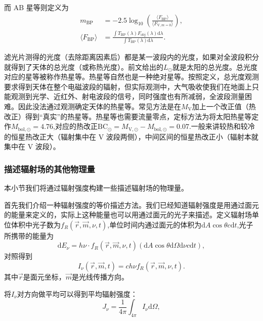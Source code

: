 \documentclass[../天体物理基础.tex]{subfiles}
\begin{document}
而 AB 星等则定义为
\begin{align}
m_{\mathrm{BP}}&=-2.5\log_{10}(\frac{\langle F_{\mathrm{BP}}\rangle}{\langle F_{\text{V},m=0}\rangle}),\\
\langle F_{\mathrm{BP}}\rangle&=\frac{\int T_{\mathrm{BP}}(\lambda)F_{\text{obj}}(\lambda)\mathrm{d}\lambda}{\int T_{\mathrm{BP}}(\lambda)\mathrm{d}\lambda}.
\end{align}

滤光片测得的光度（去除距离因素后）都是某一波段内的光度，如果对全波段积分就得到了天体的总光度（或称热光度）。前文给出的$L_{\odot}$就是太阳的总光度。总光度对应的星等被称作热星等。热星等自然也是一种绝对星等。按照定义，总光度观测要求得到天体在整个电磁波段的辐射，但实际观测中，大气吸收使我们在地面上只能观测到光学、近红外、射电波段的信号，同时强度也有所减弱，全波段测量困难。因此没法通过观测确定天体的热星等。常见方法是在$M_{\text{V}}$加上一个改正值（热改正）得到“真实”的热星等。热星等也需要流量零点，定标方法为将太阳热星等定作$M_{\mathrm{bol},\odot}=4.76$,对应的热改正$\mathrm{BC}_{\odot}=M_{\mathrm{V},\odot}-M_{\mathrm{bol},\odot}=0.07$.一般来讲较热和较冷的恒星热改正大（辐射集中在 V 波段两侧），中间区间的恒星热改正小（辐射本就集中在 V 波段）。

\subsubsection{描述辐射场的其他物理量}
本小节我们将通过辐射强度构建一些描述辐射场的物理量。

首先我们介绍一种辐射强度的等价描述方法。我们已经知道辐射强度是用通过面元的能量来定义的，实际上这种能量也可以用通过面元的光子来描述。定义辐射场单位体积中光子数为$f_{R}\left(\vec{r},\vec{m},\nu,t\right)$,单位时间内通过面元的体积为$\mathrm{d}A\cos\theta c\mathrm{d}t$,光子所携带的能量为
\begin{equation}
\mathrm{d}E_{\nu}=h\nu\cdot f_{R}\left(\vec{r},\vec{m},\nu,t\right)\left(\mathrm{d}A\cos\theta\mathrm{d}\Omega\mathrm{d}\nu c\mathrm{d}t\right),
\end{equation}
对照得到
\begin{equation}
I_{\nu}\left(\vec{r},\vec{m},t\right)=ch\nu f_{R}\left(\vec{r},\vec{m},\nu,t\right).
\end{equation}
其中$\vec{r}$是面元坐标，$\vec{m}$是光线传播方向。

将$I_{\nu}$对方向做平均可以得到平均辐射强度：
\begin{equation}
J_{\nu}=\frac1{4\pi}\int_{4\pi}I_{\nu}\mathrm{d}\Omega,
\end{equation}
\end{document}
